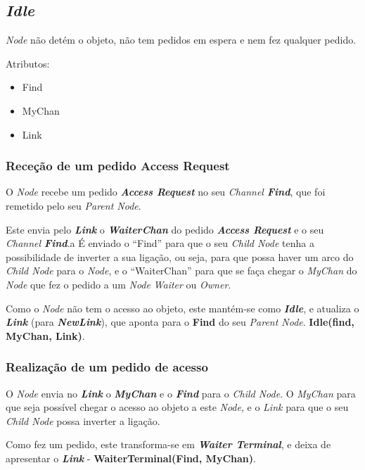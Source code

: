 \subsection*{\emph{Idle}}
\label{especificacao:nodes:idle}

\emph{Node} não detém o objeto, não tem pedidos em espera e nem fez qualquer pedido. 

Atributos:
\begin{itemize}
    \item Find
    \item MyChan
    \item Link
\end{itemize}

\subsubsection*{Receção de um pedido Access Request}
O \emph{Node} recebe um pedido \emph{\textbf{Access Request}} no seu \emph{Channel \textbf{Find}}, que foi remetido pelo seu \emph{Parent Node}.

Este envia pelo \textbf{\emph{Link}} o \textbf{\emph{WaiterChan}} do pedido \emph{\textbf{Access Request}} e o seu \emph{Channel \textbf{Find}}.a
É enviado o ``Find'' para que o seu \emph{Child Node} tenha a possibilidade de inverter a sua ligação, ou seja, para que possa haver um arco do \emph{Child Node} para o \emph{Node}, 
e o ``WaiterChan'' para que se faça chegar o \emph{MyChan} do \emph{Node} que fez o pedido a um \emph{Node} \emph{Waiter} ou \emph{Owner}.

Como o \emph{Node} não tem o acesso ao objeto, este mantém-se como \emph{\textbf{Idle}}, e atualiza o \textbf{\emph{Link}} (para \textbf{\emph{NewLink}}), que aponta para o \textbf{Find} do seu \emph{Parent Node}.
\textbf{Idle(find, MyChan, Link)}.



\subsubsection*{Realização de um pedido de acesso}
O \emph{Node} envia no \textbf{\emph{Link}} o \textbf{\emph{MyChan}} e o \textbf{\emph{Find}} para o \emph{Child Node}.
O \emph{MyChan} para que seja possível chegar o acesso ao objeto a este \emph{Node}, e o \emph{Link} para que o seu \emph{Child Node} possa inverter a ligação.

Como fez um pedido, este transforma-se em \emph{\textbf{Waiter Terminal}}, e deixa de apresentar o \textbf{\emph{Link}} - \textbf{WaiterTerminal(Find, MyChan)}.

